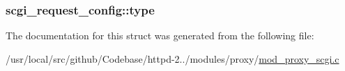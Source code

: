 \subsubsection[{\texorpdfstring{type}{type}}]{ scgi\+\_\+request\+\_\+config\+::type}\hypertarget{structscgi__request__config_a72b1090eb2802cfa408c2005deee81c9}{}\label{structscgi__request__config_a72b1090eb2802cfa408c2005deee81c9}


The documentation for this struct was generated from the following file\+:\begin{DoxyCompactItemize}
\item 
/usr/local/src/github/\+Codebase/httpd-\/2../modules/proxy/\hyperlink{mod__proxy__scgi_8c}{mod\+\_\+proxy\+\_\+scgi.\+c}\end{DoxyCompactItemize}
